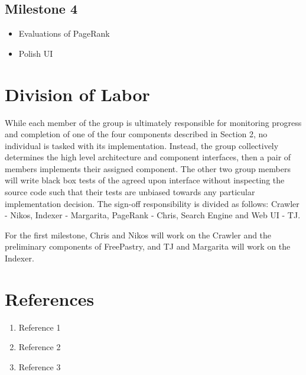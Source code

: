\documentclass[11pt, letterpaper, oneside, twocolumn]{article}
\begin{document}
\subsection{Milestone 4}

\begin{itemize}
\item            Evaluations of PageRank
\item            Polish UI
\end{itemize}


\section{ Division of Labor }

While each member of the group is ultimately responsible for monitoring progress and completion of one of the four components described in Section 2, no individual is tasked with its implementation.  Instead, the group collectively determines the high level architecture and component interfaces, then a pair of members implements their assigned component.  The other two group members will write black box tests of the agreed upon interface without inspecting the source code such that their tests are unbiased towards any particular implementation decision. The sign-off responsibility is divided as follows: Crawler - Nikos, Indexer - Margarita, PageRank - Chris, Search Engine and Web UI - TJ.

For the first milestone, Chris and Nikos will work on the Crawler and the preliminary components of FreePastry, and TJ and Margarita will work on the Indexer.

\section{References}

\begin{enumerate}
\item Reference 1
\item Reference 2
\item Reference 3
\end{enumerate}
\end{document}
